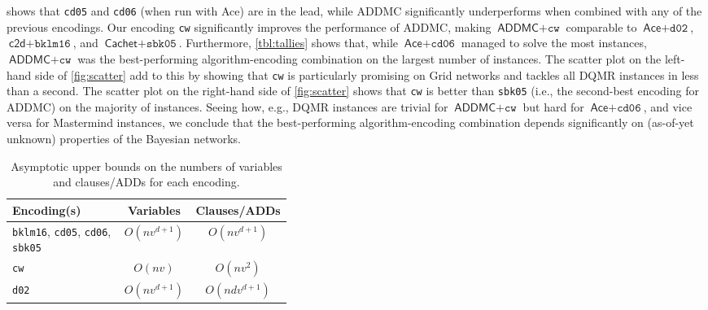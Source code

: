 \documentclass{uai2021} %
\theoremstyle{definition}
\begin{document}

 shows that \texttt{cd05} and
\texttt{cd06} (when run with \textsf{Ace}) are in the lead, while \textsf{ADDMC}
significantly underperforms when combined with any of the previous encodings.
Our encoding \texttt{cw} significantly improves the performance of
\textsf{ADDMC}, making $\textsf{ADDMC}+\texttt{cw}$ comparable to
$\textsf{Ace}+\texttt{d02}$, $\textsf{c2d}+\texttt{bklm16}$, and
$\textsf{Cachet}+\texttt{sbk05}$. Furthermore,
\cref{tbl:tallies} shows that, while $\textsf{Ace}+\texttt{cd06}$ managed to
solve the most instances, $\textsf{ADDMC}+\texttt{cw}$ was the best-performing
algorithm-encoding combination on the largest number of instances. The scatter
plot on the left-hand side of \cref{fig:scatter} add to this by showing that
\texttt{cw} is particularly promising on Grid networks and tackles all DQMR
instances in less than a second. The scatter plot on the right-hand side of
\cref{fig:scatter} shows that \texttt{cw} is better than \texttt{sbk05} (i.e.,
the second-best encoding for \textsf{ADDMC}) on the majority of
instances. Seeing how, e.g., DQMR instances are trivial for
$\textsf{ADDMC}+\texttt{cw}$ but hard for $\textsf{Ace}+\texttt{cd06}$, and
vice versa for Mastermind instances, we conclude that the best-performing
algorithm-encoding combination depends significantly on (as-of-yet unknown)
properties of the Bayesian networks.

\begin{table}
  \centering
  \caption{Asymptotic upper bounds on the numbers of variables and clauses/ADDs
    for each encoding.}
  \label{tbl:asymptotes}
  \begin{tabular}{m{0.4\linewidth} c c}
    \toprule
    Encoding(s) & Variables & Clauses/ADDs \\
    \midrule
    \texttt{bklm16}, \texttt{cd05}, \texttt{cd06}, \texttt{sbk05} & $O(nv^{d+1})$ & $O(nv^{d+1})$ \\
    \texttt{cw} & $O(nv)$ & $O(nv^2)$ \\
    \texttt{d02} & $O(nv^{d+1})$ & $O(ndv^{d+1})$ \\
    \bottomrule
  \end{tabular}
\end{table}
\end{document}
